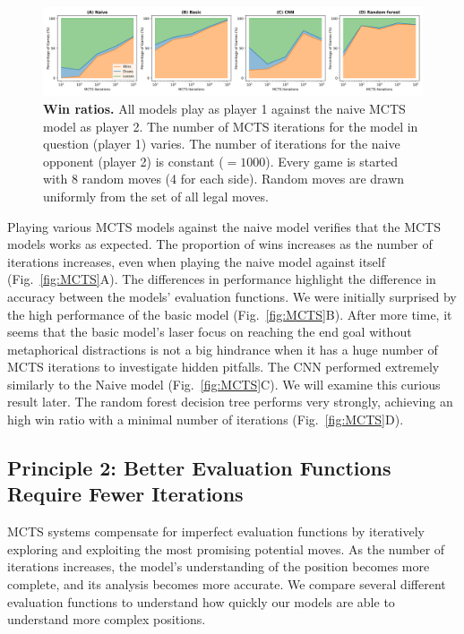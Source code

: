 \documentclass[10pt]{article}
\begin{document}
\begin{figure}[H]
    \centering
    \includegraphics[width=\linewidth]{win_rates.png}
    \caption{\textbf{Win ratios.} All models play as player 1 against the naive MCTS model as player 2. The number of MCTS iterations for the model in question (player 1) varies. The number of iterations for the naive opponent (player 2) is constant ($= 1000$). Every game is started with 8 random moves (4 for each side). Random moves are drawn uniformly from the set of all legal moves.}
    \label{fig:selfplay}
\end{figure}

Playing various MCTS models against the naive model verifies that the MCTS models works as expected. The proportion of wins increases as the number of iterations increases, even when playing the naive model against itself (Fig.~\ref{fig:MCTS}A). The differences in performance highlight the difference in accuracy between the models' evaluation functions. We were initially surprised by the high performance of the basic model (Fig.~\ref{fig:MCTS}B). After more time, it seems that the basic model's laser focus on reaching the end goal without metaphorical distractions is not a big hindrance when it has a huge number of MCTS iterations to investigate hidden pitfalls. The CNN performed extremely similarly to the Naive model (Fig.~\ref{fig:MCTS}C). We will examine this curious result later. The random forest decision tree performs very strongly, achieving an high win ratio with a minimal number of iterations (Fig.~\ref{fig:MCTS}D). 

\subsection{Principle 2: Better Evaluation Functions Require Fewer Iterations}

MCTS systems compensate for imperfect evaluation functions by iteratively exploring and exploiting the most promising potential moves. As the number of iterations increases, the model's understanding of the position becomes more complete, and its analysis becomes more accurate. We compare several different evaluation functions to understand how quickly our models are able to understand more complex positions.
\end{document}
